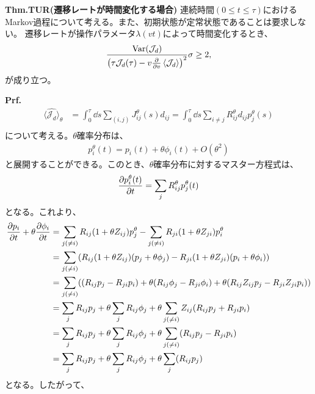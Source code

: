 \documentclass[a4paper,11pt]{jsarticle}
\numberwithin{equation}{section}
\begin{document}
\begin{itembox}[l]{\textbf{Thm.TUR(遷移レートが時間変化する場合)}}
    連続時間$(0 \leq t \leq \tau)$におけるMarkov過程について考える。また、初期状態が定常状態であることは要求しない。
    遷移レートが操作パラメータ$\lambda(vt)$によって時間変化するとき、
    \begin{align}
        \frac{\operatorname{Var}(\mathcal{J}_d)}{\left(\tau \mathcal{J}_d(\tau) - v \frac{\partial}{\partial v} \expval{\mathcal{J}_d}\right)^2} \sigma \geq 2,
    \end{align}
    が成り立つ。
\end{itembox}
\textbf{Prf.}\\
\begin{align}
    \langle \hat{\mathcal{J}_d} \rangle_\theta &=\int_0^\tau \dd{s} \sum_{(i,j)} J_{ij}^{\theta}(s)d_{ij}=\int_0^\tau \dd{s} \sum_{i \neq j} R_{ij}^{\theta}d_{ij}p_j^{\theta}(s)\\
\end{align}
について考える。$\theta$確率分布は、
\begin{align}
    p_{i}^{\theta}(t) = p_{i}(t) + \theta \phi_{i}(t) + O(\theta^2)
\end{align}
と展開することができる。このとき、$\theta$確率分布に対するマスター方程式は、
\begin{align}
    \pdv{p_{i}^{\theta}(t)}{t} = \sum_{j} R_{ij}^{\theta}p_{j}^{\theta}(t) 
\end{align}
となる。これより、
\begin{align}
    \pdv{p_{i}}{t} + \theta \pdv{\phi_{i}}{t} &=\sum_{j(\neq i)} R_{ij}(1 + \theta Z_{ij})p_{j}^{\theta} - \sum_{j(\neq i)} R_{ji}(1 + \theta Z_{ji})p_{i}^{\theta} \\
    &= \sum_{j(\neq i)} (R_{ij}(1 + \theta Z_{ij})(p_{j} + \theta \phi_{j}) - R_{ji}(1 + \theta Z_{ji})(p_{i} + \theta \phi_{i}))\\
    &= \sum_{j(\neq i)} ((R_{ij}p_{j} - R_{ji}p_{i}) + \theta(R_{ij}\phi_{j}-R_{ji}\phi_{i})+ \theta(R_{ij}Z_{ij}p_{j} - R_{ji}Z_{ji}p_{i}))\\
    &= \sum_{j} R_{ij}p_{j} + \theta \sum_{j} R_{ij}\phi_{j} + \theta \sum_{j(\neq i)} Z_{ij}(R_{ij}p_{j} + R_{ji}p_{i})\\
    &= \sum_{j} R_{ij}p_{j} + \theta \sum_{j} R_{ij}\phi_{j} + \theta \sum_{j(\neq i)} (R_{ij}p_{j} - R_{ji}p_{i})\\
    &= \sum_{j} R_{ij}p_{j} + \theta \sum_{j} R_{ij}\phi_{j} + \theta \sum_{j} (R_{ij}p_{j})
\end{align}
となる。したがって、
\end{document}
